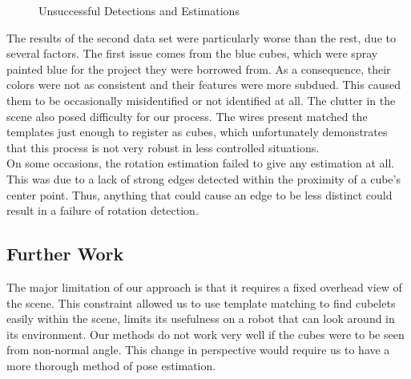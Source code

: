 \documentclass[conference]{IEEEtran}
\begin{document}
\begin{figure}[!t]
\centerline{
\label{fig_first_case}
\hfil
{}}
\caption{Unsuccessful Detections and Estimations}
\label{fig_sim}
\end{figure}

The results of the second data set were particularly worse than the rest, due to several factors.  The first issue comes from the blue cubes, which were spray painted blue for the project they were borrowed from.  As a consequence, their colors were not as consistent and their features were more subdued. This caused them to be occasionally misidentified or not identified at all.  The clutter in the scene also posed difficulty for our process.  The wires present matched the templates just enough to register as cubes, which unfortunately demonstrates that this process is not very robust in less controlled situations.\\

On some occasions, the rotation estimation failed to give any estimation at all.  This was due to a lack of strong edges detected within the proximity of a cube's center point.  Thus, anything that could cause an edge to be less distinct could result in a failure of rotation detection.




\subsection{Further Work}
The major limitation of our approach is that it requires a fixed overhead view of the scene.  This constraint allowed us to use template matching to find cubelets easily within the scene, limits its usefulness on a robot that can look around in its environment.  Our methods do not work very well if the cubes were to be seen from non-normal angle.  This change in perspective would require us to have a more thorough method of pose estimation.  \\
\end{document}
